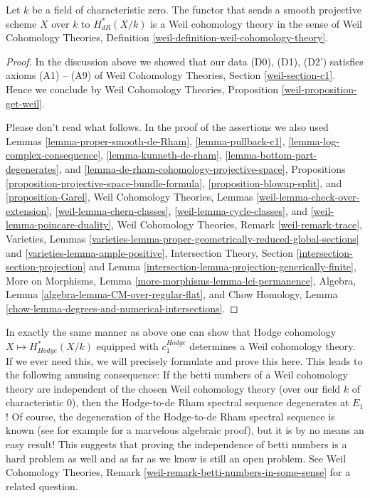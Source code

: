 \begin{proposition}
\label{proposition-de-rham-is-weil}
Let $k$ be a field of characteristic zero. The functor that
sends a smooth projective scheme $X$ over $k$ to $H_{dR}^*(X/k)$
is a Weil cohomology theory in the sense of
Weil Cohomology Theories, Definition
\ref{weil-definition-weil-cohomology-theory}.
\end{proposition}

\begin{proof}
In the discussion above we showed that our data (D0), (D1), (D2')
satisfies axioms (A1) -- (A9) of Weil Cohomology Theories, Section
\ref{weil-section-c1}. Hence we conclude by
Weil Cohomology Theories, Proposition \ref{weil-proposition-get-weil}.

\medskip\noindent
Please don't read what follows. In the proof of the assertions we also used
Lemmas \ref{lemma-proper-smooth-de-Rham},
\ref{lemma-pullback-c1},
\ref{lemma-log-complex-consequence},
\ref{lemma-kunneth-de-rham},
\ref{lemma-bottom-part-degenerates}, and
\ref{lemma-de-rham-cohomology-projective-space},
Propositions
\ref{proposition-projective-space-bundle-formula},
\ref{proposition-blowup-split}, and
\ref{proposition-Garel},
Weil Cohomology Theories, Lemmas
\ref{weil-lemma-check-over-extension},
\ref{weil-lemma-chern-classes},
\ref{weil-lemma-cycle-classes}, and
\ref{weil-lemma-poincare-duality},
Weil Cohomology Theories, Remark \ref{weil-remark-trace},
Varieties, Lemmas
\ref{varieties-lemma-proper-geometrically-reduced-global-sections} and
\ref{varieties-lemma-ample-positive},
Intersection Theory, Section \ref{intersection-section-projection} and
Lemma \ref{intersection-lemma-projection-generically-finite},
More on Morphisms, Lemma \ref{more-morphisms-lemma-lci-permanence},
Algebra, Lemma \ref{algebra-lemma-CM-over-regular-flat}, and
Chow Homology, Lemma
\ref{chow-lemma-degrees-and-numerical-intersections}.
\end{proof}

\begin{remark}
\label{remark-hodge-cohomology-is-weil}
In exactly the same manner as above one can show that
Hodge cohomology $X \mapsto H_{Hodge}^*(X/k)$ equipped
with $c_1^{Hodge}$ determines a Weil
cohomology theory. If we ever need this, we will precisely
formulate and prove this here. This leads to the following
amusing consequence: If the betti numbers of a Weil cohomology
theory are independent of the chosen Weil cohomology theory
(over our field $k$ of characteristic $0$), then
the Hodge-to-de Rham spectral sequence
degenerates at $E_1$! Of course, the degeneration of
the Hodge-to-de Rham spectral sequence is known
(see for example \cite{Deligne-Illusie} for a marvelous algebraic proof),
but it is by no means an easy result! This suggests that proving
the independence of betti numbers is a hard problem as well
and as far as we know is still an open problem. See
Weil Cohomology Theories, Remark
\ref{weil-remark-betti-numbers-in-some-sense} for a related question.
\end{remark}







